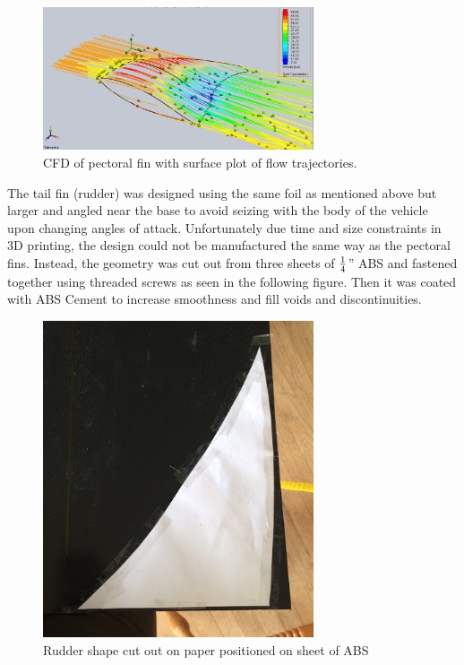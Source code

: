 \documentclass{report}
\begin{document}
\begin{figure}[H]
\centering
\includegraphics[width=8cm]{cscfd}
\caption{CFD of pectoral fin with surface plot of flow trajectories.}
\end{figure}
The tail fin (rudder) was designed using the same foil as mentioned above but larger and angled near the base to avoid seizing with the body of the vehicle upon changing angles of attack. Unfortunately due time and size constraints in 3D printing, the design could not be manufactured the same way as the pectoral fins. Instead, the geometry was cut out from three sheets of $1\over4$” ABS and fastened together using threaded screws as seen in the following figure. Then it was coated with ABS Cement to increase smoothness and fill voids and discontinuities. 
\begin{figure}[H]
\centering
\includegraphics[width=8cm]{rudder}
\caption{Rudder shape cut out on paper positioned on sheet of ABS}
\end{figure}
\end{document}
